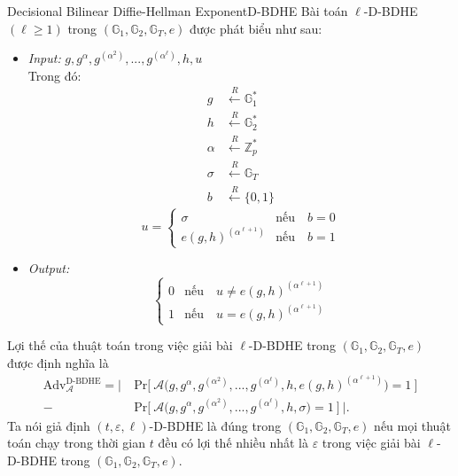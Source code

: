 \documentclass[class=report, crop=false]{standalone}
\begin{document}
		\begin{problem}{Decisional Bilinear Diffie-Hellman Exponent}{D-BDHE}
			Bài toán $\ell$-D-BDHE $(\ell \geq 1)$ trong $(\mathbb{G}_1, \mathbb{G}_2, \mathbb{G}_T, e)$ được phát biểu như sau:
			\vspace{-\baselineskip}
			\begin{itemize}[leftmargin=1.5cm, itemindent=-0.5cm]
				\item[] \textit{Input:} $g, g^\alpha, g^{(\alpha^2)}, ..., g^{(\alpha^\ell)}, h, u$ \\
				Trong đó: \vspace{-\baselineskip}
				\begin{align*}
					g 		&\xleftarrow{R} \mathbb{G}_1^* \\
					h 		&\xleftarrow{R} \mathbb{G}_2^* \\
					\alpha 	&\xleftarrow{R} \mathbb{Z}_p^* \\
					\sigma 	&\xleftarrow{R} \mathbb{G}_T \\
					b 		&\xleftarrow{R} \{ 0, 1 \}
				\end{align*}
				\[
					u = \begin{cases}
						\sigma 							&\text{nếu}\quad b = 0 \\
						e(g, h)^{(\alpha^{\ell + 1})} 	&\text{nếu}\quad b = 1
					\end{cases}
				\]
				\item[] \textit{Output:}
				\[
					\begin{cases}
						0 &\text{nếu}\quad u \neq e(g, h)^{(\alpha^{\ell + 1})} \\
						1 &\text{nếu}\quad u = e(g, h)^{(\alpha^{\ell + 1})}
					\end{cases}
				\] 
			\end{itemize}
			\vspace{-\baselineskip}\par
			Lợi thế của thuật toán \algo trong việc giải bài $\ell$-D-BDHE trong $(\mathbb{G}_1, \mathbb{G}_2, \mathbb{G}_T, e)$ được định nghĩa là
			\begin{equation*}
				\begin{split}
					\text{Adv}_{\mathcal{A}}^{\text{D-BDHE}} = \Bigg|\ &\text{Pr}\bigg[ \ \mathcal{A}\Big(g, g^\alpha, g^{(\alpha^2)}, ..., g^{(\alpha^\ell)}, h, e(g, h)^{(\alpha^{\ell + 1})} \Big) = 1 \ \bigg] \\
					- &\text{Pr}\bigg[ \ \mathcal{A}\Big(g, g^\alpha, g^{(\alpha^2)}, ..., g^{(\alpha^\ell)}, h, \sigma \Big) = 1 \ \bigg]\ \Bigg|.
				\end{split}
			\end{equation*} \indent
			Ta nói giả định $(t, \varepsilon, \ell)$-D-BDHE là đúng trong $(\mathbb{G}_1, \mathbb{G}_2, \mathbb{G}_T, e)$ nếu mọi thuật toán chạy trong thời gian $t$ đều có lợi thế nhiều nhất là $\varepsilon$ trong việc giải bài $\ell$-D-BDHE trong $(\mathbb{G}_1, \mathbb{G}_2, \mathbb{G}_T, e)$.
		\end{problem}
\end{document}
